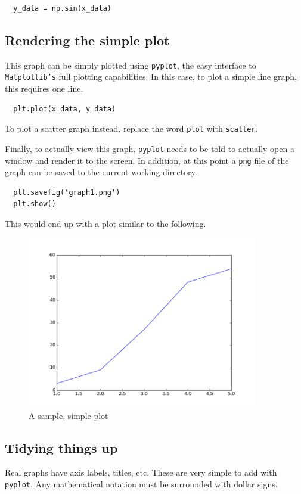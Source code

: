\documentclass{article}
\begin{document}
\begin{lstlisting}
  y_data = np.sin(x_data)
\end{lstlisting}

\subsection{Rendering the simple plot}
This graph can be simply plotted using \texttt{pyplot}, the easy
interface to \texttt{Matplotlib's} full plotting capabilities. In this
case, to plot a simple line graph, this requires one line.

\begin{lstlisting}
  plt.plot(x_data, y_data)
\end{lstlisting}

To plot a scatter graph instead, replace the word \texttt{plot} with
\texttt{scatter}.

Finally, to actually view this graph, \texttt{pyplot} needs to be told
to actually open a window and render it to the screen. In addition, at
this point a \texttt{png} file of the graph can be saved to the
current working directory.

\begin{lstlisting}
  plt.savefig('graph1.png')
  plt.show()
\end{lstlisting}

This would end up with a plot similar to the following.

\begin{figure}[H]
  \centering
  \includegraphics[width=10cm]{ch1.png}
  \caption{A sample, simple plot}
  \label{fig:ch1}
\end{figure}

\subsection{Tidying things up}
Real graphs have axis labels, titles, etc. These are very simple to
add with \texttt{pyplot}. Any mathematical notation must be surrounded
with dollar signs.
\end{document}

